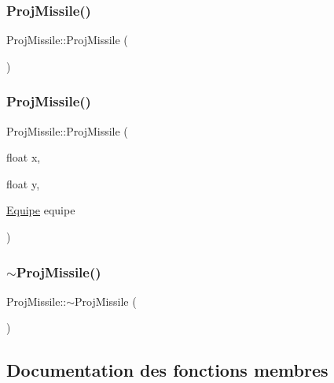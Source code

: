 \subsubsection{\texorpdfstring{Proj\+Missile()}{ProjMissile()}\hspace{0.1cm}{\footnotesize\ttfamily [1/2]}}
{\footnotesize\ttfamily Proj\+Missile\+::\+Proj\+Missile (\begin{DoxyParamCaption}{ }\end{DoxyParamCaption})}

\mbox{\label{class_proj_missile_a4351ac217088340ca26d71e986cae860}} 
\subsubsection{\texorpdfstring{Proj\+Missile()}{ProjMissile()}\hspace{0.1cm}{\footnotesize\ttfamily [2/2]}}
{\footnotesize\ttfamily Proj\+Missile\+::\+Proj\+Missile (\begin{DoxyParamCaption}\item[{float}]{x,  }\item[{float}]{y,  }\item[{\hyperlink{constantes_8h_a08fa5554288d5031a8f3bb83cc04ee83}{Equipe}}]{equipe }\end{DoxyParamCaption})}

\mbox{\label{class_proj_missile_adf1e62cc1a0c195b6de72ca7830338c5}} 
\subsubsection{\texorpdfstring{$\sim$\+Proj\+Missile()}{~ProjMissile()}}
{\footnotesize\ttfamily Proj\+Missile\+::$\sim$\+Proj\+Missile (\begin{DoxyParamCaption}{ }\end{DoxyParamCaption})}



\subsection{Documentation des fonctions membres}
\mbox{\label{class_proj_missile_a8125c442857f7a0fc2d0ff442c39aca7}} 
